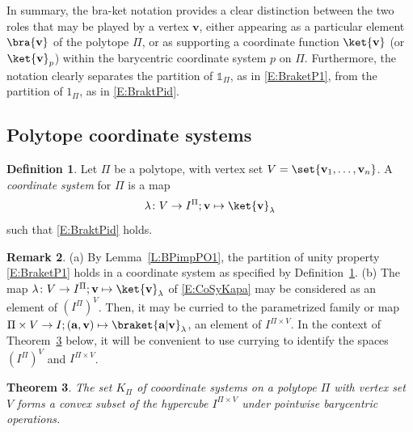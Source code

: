 \documentclass[12pt]{amsart}
\theoremstyle{plain}
\newtheorem{theorem}{Theorem}[section]
\theoremstyle{definition}
\newtheorem{definition}[theorem]{Definition}
\newtheorem{remark}[theorem]{Remark}
\numberwithin{equation}{section}
\begin{document}
In summary, the bra-ket notation provides a clear distinction between the two roles that may be played by a vertex $\mathbf v$, either appearing as a particular element $\bra{\mathbf v}$ of the polytope $\Pi$, or as supporting a coordinate function $\ket{\mathbf v}$ (or $\ket{\mathbf v}_p$) within the barycentric coordinate system $p$ on $\Pi$. Furthermore, the notation clearly separates the partition of $\mathds 1_\Pi$, as in \eqref{E:BraketP1}, from the partition of $1_\Pi$, as in \eqref{E:BraktPid}.


\subsection{Polytope coordinate systems}\label{SS:PolCoSys}



\begin{definition}\label{D:PolCoSys}
Let $\Pi$ be a polytope, with vertex set $V=\set{\mathbf v_1,\dots,\mathbf v_n}$. A \emph{coordinate system} for $\Pi$ is a map
\begin{equation}\label{E:CoSyKapa}
\lambda\colon V\to I^\Pi;\mathbf v\mapsto\ket{\mathbf v}_\lambda
\end{equation}
such that \eqref{E:BraktPid} holds.
\end{definition}


\begin{remark}\label{R:PolCoSys}
(a)
By Lemma~\ref{L:BPimpPO1}, the partition of unity property \eqref{E:BraketP1} holds in a coordinate system as specified by Definition~\ref{D:PolCoSys}.
\vskip 2mm
\noindent
(b)
The map $\lambda\colon V\to I^\Pi;\mathbf v\mapsto\ket{\mathbf v}_\lambda$ of \eqref{E:CoSyKapa} may be considered as an element of $(I^\Pi)^V$. Then, it may be curried to the parametrized family or map $\Pi\times V\to I;(\mathbf a,\mathbf v)\mapsto\braket{\mathbf a|\mathbf v}_\lambda$, an element of $I^{\Pi\times V}$. In the context of Theorem~\ref{T:PolCoSys} below, it will be convenient to use currying to identify the spaces $(I^\Pi)^V$ and $I^{\Pi\times V}$.
\end{remark}

\begin{theorem}\label{T:PolCoSys}
The set $K_\Pi$ of cooordinate systems on a polytope $\Pi$ with vertex set $V$ forms a convex subset of the hypercube $I^{\Pi\times V}$ under pointwise barycentric operations.
\end{theorem}
\end{document}
